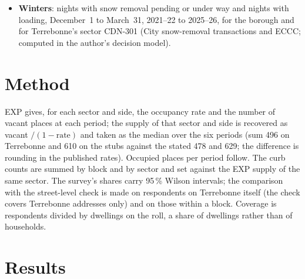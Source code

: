\documentclass[11pt,a4paper]{article}
\begin{document}
\begin{itemize}
\item \textbf{Winters}: nights with snow removal pending or under way and nights with loading, December~1 to March~31, 2021--22 to 2025--26, for the borough and for Terrebonne\textquoteright{}s sector CDN-301 (City snow-removal transactions and ECCC; computed in the author\textquoteright{}s decision model).
\end{itemize}

\section{Method}
EXP gives, for each sector and side, the occupancy rate and the number of vacant places at each period; the supply of that sector and side is recovered as vacant $/(1 - \text{rate})$ and taken as the median over the six periods (sum 496 on Terrebonne and 610 on the stubs against the stated 478 and 629; the difference is rounding in the published rates). Occupied places per period follow. The curb counts are summed by block and by sector and set against the EXP supply of the same sector. The survey\textquoteright{}s shares carry 95\,\% Wilson intervals; the comparison with the street-level check is made on respondents on Terrebonne itself (the check covers Terrebonne addresses only) and on those within a block. Coverage is respondents divided by dwellings on the roll, a share of dwellings rather than of households.

\section{Results}
\end{document}
